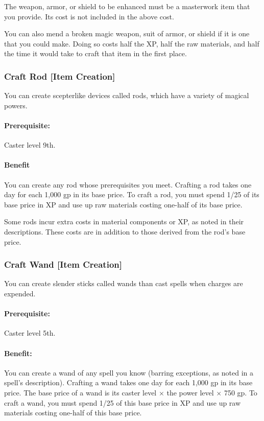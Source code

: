The weapon, armor, or shield to be enhanced must be a masterwork item that you provide. Its cost is not included in the above cost.

You can also mend a broken magic weapon, suit of armor, or shield if it is one that you could make. Doing so costs half the XP, half the raw materials, and half the time it would take to craft that item in the first place.

\subsubsection[Craft Rod]{Craft Rod [Item Creation]}
\label{Feat:CraftRod}
You can create scepterlike devices called rods, which have a variety of magical powers.

\paragraph{Prerequisite:}
Caster level 9th.

\paragraph{Benefit}
You can create any rod whose prerequisites you meet. 
Crafting a rod takes one day for each 1,000 gp in its base price. 
To craft a rod, you must spend 1/25 of its base price in XP and use up raw materials costing one-half of its base price.

Some rods incur extra costs in material components or XP, as noted in their descriptions. 
These costs are in addition to those derived from the rod’s base price.

\subsubsection[Craft Wand]{Craft Wand [Item Creation]}
\label{Feat:CraftWand}
You can create slender sticks called wands than cast spells when charges are expended.

\paragraph{Prerequisite:}
Caster level 5th.

\paragraph{Benefit:}
You can create a wand of any spell you know (barring exceptions, as noted in a spell's description). 
Crafting a wand takes one day for each 1,000 gp in its base price. 
The base price of a wand is its caster level $\times$ the power level $\times$ 750 gp. 
To craft a wand, you must spend 1/25 of this base price in XP and use up raw materials costing one-half of this base price.


